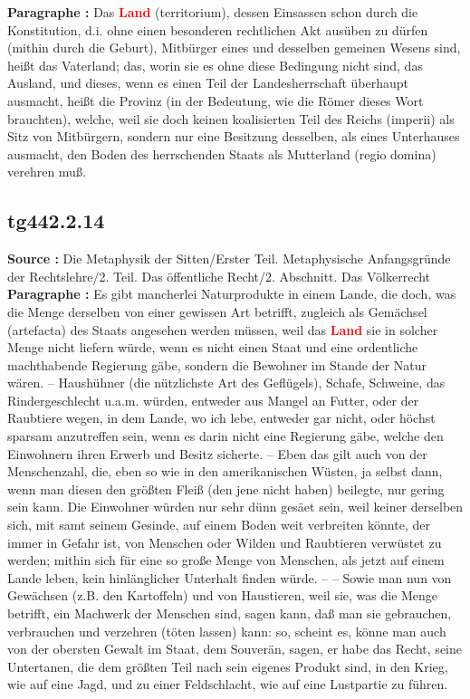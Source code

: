 \documentclass[a4paper,12pt,twoside]{book}
\newcommand{\match}[1]{\textcolor{red}{\textbf{#1}}}
\begin{document}
	\textbf{Paragraphe : }Das \match{Land} (territorium), dessen Einsassen schon durch die Konstitution, d.i. ohne einen besonderen rechtlichen Akt ausüben zu dürfen (mithin durch die Geburt), Mitbürger eines und desselben gemeinen Wesens sind, heißt das Vaterland; das, worin sie es ohne diese Bedingung nicht sind, das Ausland, und dieses, wenn es einen Teil der Landesherrschaft überhaupt ausmacht, heißt die Provinz (in der Bedeutung, wie die Römer dieses Wort brauchten), welche, weil sie doch keinen koalisierten Teil des Reichs (imperii) als Sitz von Mitbürgern, sondern nur eine Besitzung desselben, als eines Unterhauses ausmacht, den Boden des herrschenden Staats als Mutterland (regio domina) verehren muß. 
	
	\subsection*{tg442.2.14} 
	\textbf{Source : }Die Metaphysik der Sitten/Erster Teil. Metaphysische Anfangsgründe der Rechtslehre/2. Teil. Das öffentliche Recht/2. Abschnitt. Das Völkerrecht\\  
	
	\textbf{Paragraphe : }Es gibt mancherlei Naturprodukte in einem Lande, die doch, was die Menge derselben von einer gewissen Art betrifft, zugleich als Gemächsel (artefacta) des Staats angesehen werden müssen, weil das \match{Land} sie in solcher Menge nicht liefern würde, wenn es nicht einen Staat und eine ordentliche machthabende Regierung gäbe, sondern die Bewohner im Stande der Natur wären. – Haushühner (die nützlichste Art des Geflügels), Schafe, Schweine, das Rindergeschlecht u.a.m. würden, entweder aus Mangel an Futter, oder der Raubtiere wegen, in dem Lande, wo ich lebe, entweder gar nicht, oder höchst sparsam anzutreffen sein, wenn es darin nicht eine Regierung gäbe, welche den Einwohnern ihren Erwerb und Besitz sicherte. – Eben das gilt auch von der Menschenzahl, die, eben so wie in den amerikanischen Wüsten, ja selbst dann, wenn man diesen den größten Fleiß (den jene nicht haben) beilegte, nur gering sein kann. Die Einwohner würden nur sehr dünn gesäet sein, weil keiner derselben sich, mit samt seinem Gesinde, auf einem Boden weit verbreiten könnte, der immer in Gefahr ist, von Menschen oder Wilden und Raubtieren verwüstet zu werden; mithin sich für eine so große Menge von Menschen, als jetzt auf einem Lande leben, kein hinlänglicher Unterhalt finden würde. – – Sowie man nun von Gewächsen (z.B. den Kartoffeln) und von Haustieren, weil sie, was die Menge betrifft, ein Machwerk der Menschen sind, sagen kann, daß man sie gebrauchen, verbrauchen und verzehren (töten lassen) kann: so, scheint es, könne man auch von der obersten Gewalt im Staat, dem Souverän, sagen, er  habe das Recht, seine Untertanen, die dem größten Teil nach sein eigenes Produkt sind, in den Krieg, wie auf eine Jagd, und zu einer Feldschlacht, wie auf eine Lustpartie zu führen. 
	
\end{document}
